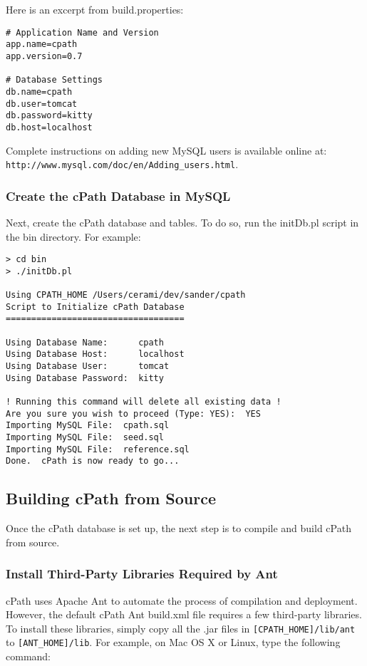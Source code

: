 \documentclass[letterpaper,12pt]{article}
\begin{document}
Here is an excerpt from build.properties:

\begin{verbatim}
# Application Name and Version
app.name=cpath
app.version=0.7

# Database Settings
db.name=cpath
db.user=tomcat
db.password=kitty
db.host=localhost 
\end{verbatim}

Complete instructions on adding new MySQL users is available online at:
\verb+http://www.mysql.com/doc/en/Adding_users.html+.

\subsubsection{Create the cPath Database in MySQL}

Next, create the cPath database and tables.  To do so, run the initDb.pl script in the bin directory. For example:

\begin{verbatim}
> cd bin
> ./initDb.pl

Using CPATH_HOME /Users/cerami/dev/sander/cpath
Script to Initialize cPath Database
===================================

Using Database Name:      cpath
Using Database Host:      localhost
Using Database User:      tomcat
Using Database Password:  kitty

! Running this command will delete all existing data !
Are you sure you wish to proceed (Type: YES):  YES
Importing MySQL File:  cpath.sql
Importing MySQL File:  seed.sql
Importing MySQL File:  reference.sql
Done.  cPath is now ready to go...
\end{verbatim}

\subsection{Building cPath from Source}

Once the cPath database is set up, the next step is to compile and build cPath from source.

\subsubsection{Install Third-Party Libraries Required by Ant}

cPath uses Apache Ant to automate the process of compilation and deployment.  However, the default cPath Ant build.xml file requires a few third-party libraries.  To install these libraries, simply copy all the .jar files in \verb+[CPATH_HOME]/lib/ant+ to \verb+[ANT_HOME]/lib+.  For example, on Mac OS X or Linux, type the following command:
 
\end{document}
